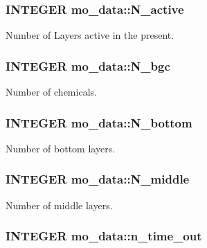 \hypertarget{namespacemo__data_adcca7f2476501b41d758129cc352af3b}{
\subsubsection[{N\_\-active}]{\setlength{\rightskip}{0pt plus 5cm}INTEGER {\bf mo\_\-data::N\_\-active}}}
\label{namespacemo__data_adcca7f2476501b41d758129cc352af3b}


Number of Layers active in the present. 

\hypertarget{namespacemo__data_a25de952ac1cfddcf1328f99e9e490ed3}{
\subsubsection[{N\_\-bgc}]{\setlength{\rightskip}{0pt plus 5cm}INTEGER {\bf mo\_\-data::N\_\-bgc}}}
\label{namespacemo__data_a25de952ac1cfddcf1328f99e9e490ed3}


Number of chemicals. 

\hypertarget{namespacemo__data_a9c89af560a3d2f1fe1027bf81125b16c}{
\subsubsection[{N\_\-bottom}]{\setlength{\rightskip}{0pt plus 5cm}INTEGER {\bf mo\_\-data::N\_\-bottom}}}
\label{namespacemo__data_a9c89af560a3d2f1fe1027bf81125b16c}


Number of bottom layers. 

\hypertarget{namespacemo__data_a1140e1d6804c776a152d059c6ecd8375}{
\subsubsection[{N\_\-middle}]{\setlength{\rightskip}{0pt plus 5cm}INTEGER {\bf mo\_\-data::N\_\-middle}}}
\label{namespacemo__data_a1140e1d6804c776a152d059c6ecd8375}


Number of middle layers. 

\hypertarget{namespacemo__data_a39a97d63744c18a6e9f3524d2dcc4154}{
\subsubsection[{n\_\-time\_\-out}]{\setlength{\rightskip}{0pt plus 5cm}INTEGER {\bf mo\_\-data::n\_\-time\_\-out}}}
\label{namespacemo__data_a39a97d63744c18a6e9f3524d2dcc4154}


